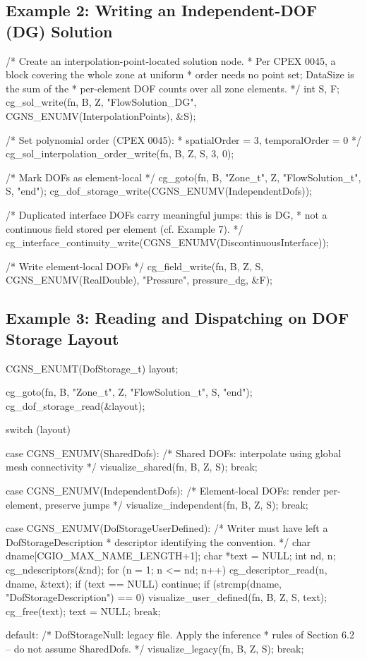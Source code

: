 \documentclass[11pt,letterpaper]{article}
\makeatletter
\let\cgns@orig@lstlisting\lstlisting
\let\cgns@endorig@lstlisting\endlstlisting
\renewenvironment{lstlisting}
  {\par\needspace{5\baselineskip}\nolinenumbers\cgns@orig@lstlisting}
  {\cgns@endorig@lstlisting\par\linenumbers}
\makeatother
\begin{document}
\subsection{Example 2: Writing an Independent-DOF (DG) Solution}
\label{ex:dg-write}

\begin{lstlisting}[language=C]
/* Create an interpolation-point-located solution node.
 * Per CPEX 0045, a block covering the whole zone at uniform
 * order needs no point set; DataSize is the sum of the
 * per-element DOF counts over all zone elements. */
int S, F;
cg_sol_write(fn, B, Z, "FlowSolution_DG",
    CGNS_ENUMV(InterpolationPoints), &S);

/* Set polynomial order (CPEX 0045):
 * spatialOrder = 3, temporalOrder = 0 */
cg_sol_interpolation_order_write(fn, B, Z, S, 3, 0);

/* Mark DOFs as element-local */
cg_goto(fn, B, "Zone_t", Z, "FlowSolution_t", S, "end");
cg_dof_storage_write(CGNS_ENUMV(IndependentDofs));

/* Duplicated interface DOFs carry meaningful jumps: this is DG,
 * not a continuous field stored per element (cf. Example 7). */
cg_interface_continuity_write(CGNS_ENUMV(DiscontinuousInterface));

/* Write element-local DOFs */
cg_field_write(fn, B, Z, S, CGNS_ENUMV(RealDouble),
    "Pressure", pressure_dg, &F);
\end{lstlisting}

\subsection{Example 3: Reading and Dispatching on DOF Storage Layout}
\label{ex:dispatch}

\begin{lstlisting}[language=C]
CGNS_ENUMT(DofStorage_t) layout;

cg_goto(fn, B, "Zone_t", Z, "FlowSolution_t", S, "end");
cg_dof_storage_read(&layout);

switch (layout) {
case CGNS_ENUMV(SharedDofs):
    /* Shared DOFs: interpolate using global mesh connectivity */
    visualize_shared(fn, B, Z, S);
    break;

case CGNS_ENUMV(IndependentDofs):
    /* Element-local DOFs: render per-element, preserve jumps */
    visualize_independent(fn, B, Z, S);
    break;

case CGNS_ENUMV(DofStorageUserDefined): {
    /* Writer must have left a DofStorageDescription
     * descriptor identifying the convention. */
    char dname[CGIO_MAX_NAME_LENGTH+1];
    char *text = NULL;
    int nd, n;
    cg_ndescriptors(&nd);
    for (n = 1; n <= nd; n++) {
        cg_descriptor_read(n, dname, &text);
        if (text == NULL) continue;
        if (strcmp(dname, "DofStorageDescription") == 0)
            visualize_user_defined(fn, B, Z, S, text);
        cg_free(text);
        text = NULL;
    }
    break;
}

default:
    /* DofStorageNull: legacy file.  Apply the inference
     * rules of Section 6.2 -- do not assume SharedDofs. */
    visualize_legacy(fn, B, Z, S);
    break;
}
\end{lstlisting}
\end{document}
